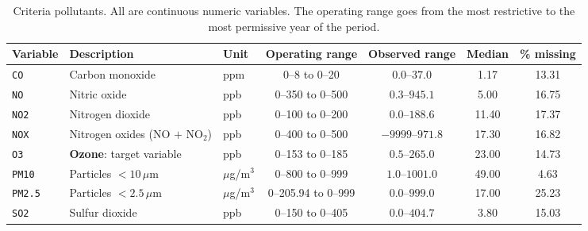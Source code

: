 \begin{table}[pos=t]
  \centering
  \caption{Criteria pollutants. All are continuous numeric variables. The
    operating range goes from the most restrictive to the most permissive
    year of the period.}
  \label{tab:dic-contaminantes}
  \small
  \begin{tabular}{lllcccc}
    \toprule
    Variable & Description & Unit & Operating range & Observed range & Median & \% missing \\
    \midrule
    \texttt{CO}    & Carbon monoxide                       & ppm             & 0--8 to 0--20       & $0.0$--$37.0$    & 1.17  & 13.31 \\
    \texttt{NO}    & Nitric oxide                          & ppb             & 0--350 to 0--500    & $0.3$--$945.1$   & 5.00  & 16.75 \\
    \texttt{NO2}   & Nitrogen dioxide                      & ppb             & 0--100 to 0--200    & $0.0$--$188.6$   & 11.40 & 17.37 \\
    \texttt{NOX}   & Nitrogen oxides (NO $+$ NO$_2$)       & ppb             & 0--400 to 0--500    & $-9999$--$971.8$ & 17.30 & 16.82 \\
    \texttt{O3}    & \textbf{Ozone}: target variable       & ppb             & 0--153 to 0--185    & $0.5$--$265.0$   & 23.00 & 14.73 \\
    \texttt{PM10}  & Particles $<10\,\mu$m                 & $\mu$g/m$^3$    & 0--800 to 0--999    & $1.0$--$1001.0$  & 49.00 & 4.63  \\
    \texttt{PM2.5} & Particles $<2.5\,\mu$m                & $\mu$g/m$^3$    & 0--205.94 to 0--999 & $0.0$--$999.0$   & 17.00 & 25.23 \\
    \texttt{SO2}   & Sulfur dioxide                        & ppb             & 0--150 to 0--405    & $0.0$--$404.7$   & 3.80  & 15.03 \\
    \bottomrule
  \end{tabular}
\end{table}


